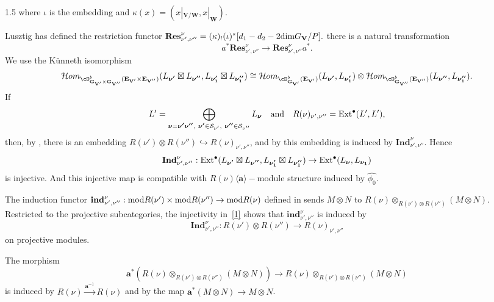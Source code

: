 \documentclass[10pt]{amsart}
\def\Ext{\mbox{\rm Ext}}   \def\Ker{\mbox{\rm Ker}\,}
\def\dim{\mbox{\rm dim}}   \def\End{\mbox{\rm End}}
\def\mod{\mbox{\rm mod}} \def\mx{\mbox{\rm max}} \def\tr{\mbox{\rm tr}}
\def\bfV{{\mathbf V}}
\def\bfV{\mathbf{V}}
\def\bfW{\mathbf{W}}
\def\bfE{\mathbf{E}}
\def\bfG{\mathbf{G}}
\def\Ind{\mathbf{Ind}}
\def\Res{\mathbf{Res}}
\def\ind{\mathbf{ind}}
\begin{document}
\begin{spacing}{1.5}
where $\iota$ is the embedding and $\kappa(x)=(x|_{\bfV/\bfW},x|_{\bfW})$.

Lusztig has defined the restriction functor $\mathbf{Res}_{\nu',\nu''}^{\nu}=(\kappa)_!(\iota)^*[d_1-d_2-2\dim G_{\bfV}/P].$
there is a natural transformation
\[
a^* \Res_{\nu',\nu''}^{\nu} \rightarrow \Res_{\nu',\nu''}^{\nu} a^*.
\]
We use the K\"unneth isomorphism
\[
\mathcal{H}om_{\cD^b_{\bfG_{\bfV'}\times \bfG_{\bfV''}}(\bfE_{\bfV'}\times \bfE_{\bfV''})}
(L_{\boldsymbol{\nu'}}\boxtimes L_{\boldsymbol{\nu''}},L_{\boldsymbol{\nu_1'}}\boxtimes L_{\boldsymbol{\nu_1''}})
\cong
\mathcal{H}om_{\cD^b_{\bfG_{\bfV'}}(\bfE_{\bfV'})}(L_{\boldsymbol{\nu'}},L_{\boldsymbol{\nu_1'}})
\otimes
\mathcal{H}om_{\cD^b_{\bfG_{\bfV''}}(\bfE_{\bfV''})}(L_{\boldsymbol{\nu''}},L_{\boldsymbol{\nu_1''}}).
\]
If
\[
L'=\bigoplus_{\boldsymbol{\nu}=\boldsymbol{\nu'}\boldsymbol{\nu''},\ \boldsymbol{\nu'}\in \mathcal{S}_{\nu'},\ \boldsymbol{\nu''}\in \mathcal{S}_{\nu''}} L_{\boldsymbol{\nu}}
\quad \text{and} \quad
R(\nu)_{\nu',\nu''}=\Ext^{\bullet}(L',L'),
\]
then, by \cite[4.1]{VaragnoloVasserot+2011+67+100}, there is an embedding
$R(\nu')\otimes R(\nu'')\hookrightarrow R(\nu)_{\nu',\nu''}$, and by \cite[Theorem 5.7 and 5.4.3]{doi:10.1142/S1005386712000247} this embedding is induced by $\Ind_{\nu',\nu''}^{\nu}$. Hence
\begin{equation}\label{1}
\Ind_{\nu',\nu''}^{\nu}:
\Ext^{\bullet}(L_{\boldsymbol{\nu'}}\boxtimes L_{\boldsymbol{\nu''}},L_{\boldsymbol{\nu_1'}}\boxtimes L_{\boldsymbol{\nu_1''}})
\rightarrow
\Ext^{\bullet}(L_{\boldsymbol{\nu}},L_{\boldsymbol{\nu_1}})
\end{equation}
is injective. And this injective map is compatible with $R(\nu)\langle\mathbf{a}\rangle-$module structure induced by $\hat{\phi_0}.$

The induction functor
$\ind_{\nu',\nu''}^{\nu}: \mod R(\nu')\times \mod R(\nu'')\rightarrow \mod R(\nu)$
defined in \cite[4.1]{VaragnoloVasserot+2011+67+100} sends $M\otimes N$ to
$R(\nu)\otimes_{R(\nu')\otimes R(\nu'')}(M\otimes N)$. Restricted to the projective subcategories, the injectivity in~\eqref{1} shows that $\ind_{\nu',\nu''}^{\nu}$ is induced by 
\[
\Ind_{\nu',\nu''}^{\nu}:R(\nu')\otimes R(\nu'')\rightarrow R(\nu)_{\nu',\nu''}
\] on projective modules.

The morphism
\[
\mathbf{a}^*(R(\nu)\otimes_{R(\nu')\otimes R(\nu'')}(M\otimes N))
\rightarrow R(\nu)\otimes_{R(\nu')\otimes R(\nu'')}(M\otimes N)
\]
is induced by $R(\nu)\xrightarrow{\mathbf{a}^{-1}}R(\nu)$ and by the map $\mathbf{a}^*(M\otimes N)\rightarrow M\otimes N$.


\end{spacing}
\end{document}
